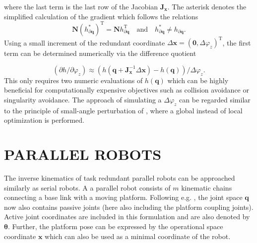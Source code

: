 \documentclass[a4paper,twoside]{article}
\newcommand{\transp}[0]{{\mathrm{T}}}
\begin{document}
where the last term is the last row of the Jacobian $\bm{J}_{\bm{x}}$.
The asterisk denotes the simplified calculation of the gradient which follows the relations
\begin{equation}
\bm{N} (h_{\partial \bm{q}}^{*})^\transp = \bm{N} h_{\partial \bm{q}}^\transp
\quad\mathrm{and}\quad
h_{\partial \bm{q}}^{*} \neq h_{\partial \bm{q}}.
\label{eq:serrob_nullspaceproj_equivalence}
\end{equation}
Using a small increment of the redundant coordinate $\Delta \bm{x}=(\bm{0},\Delta  \varphi_z)^\transp$, the first term can be determined numerically via the difference quotient





\begin{equation}
(\partial h / \partial \varphi_z) \approx (h(\bm{q}+\bm{J}_{\bm{x}}^{-1}\Delta \bm{x}) - h(\bm{q}))/\Delta \varphi_z.
\label{eq:serrob_nullspace_h_phiz}
\end{equation}
This only requires two numeric evaluations of $h(\bm{q})$ which can be highly beneficial for computationally expensive objectives such as collision avoidance or singularity avoidance.
The approach of simulating a $\Delta \varphi_z$ can be regarded similar to the principle of small-angle perturbation of \cite{GaoCheGaoXia2019}, where a global instead of local optimization is performed.


\section{\uppercase{Parallel Robots}}
\label{sec:parrob}

The inverse kinematics of task redundant parallel robots can be approached similarly as serial robots.
A a parallel robot consists of $m$ kinematic chains connecting a base link with a moving platform.
Following e.g. \cite{Merlet2006a}, the joint space $\bm{q}$ now also contains passive joints (here also including the platform coupling joints).
Active joint coordinates are included in this formulation and are also denoted by $\bm{\theta}$.
Further, the platform pose can be expressed by the operational space coordinate $\bm{x}$ which can also be used as a minimal coordinate of the robot.
\end{document}
